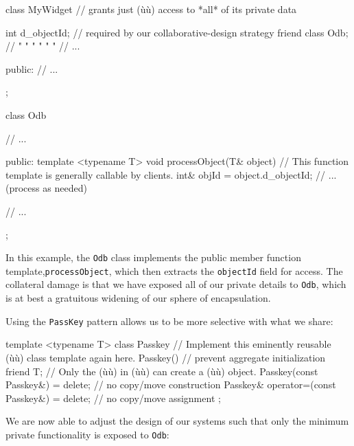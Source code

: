 \begin{emcppslisting}
class MyWidget  // grants just (ù{}ù) access to *all* of its private data
{
    int d_objectId;    // required by our collaborative-design strategy
    friend class Odb;  //    "     "   "        "        "       "
    // ...

public:
    // ...
};

class Odb
{
    // ...

public:
    template <typename T>
    void processObject(T& object)
        // This function template is generally callable by clients.
    {
        int& objId = object.d_objectId;
        // ... (process as needed)
    }

    // ...
};
\end{emcppslisting}
    
\noindent In this example, the \lstinline!Odb! class implements the public member
function template,\linebreak[4] \lstinline!processObject!, which then extracts the
\lstinline!objectId! field for access. The collateral damage is that we
have exposed all of our private details to \lstinline!Odb!, which is at
best a gratuitous widening of our sphere of encapsulation.

Using the \lstinline!PassKey! pattern allows us to be more selective with
what we share:

\begin{emcppslisting}[emcppsbatch=e3]
template <typename T>
class Passkey
    // Implement this eminently reusable (ù{}ù) class template again here.
{
    Passkey() { }  // prevent aggregate initialization
    friend T;      // Only the (ù{}ù) in (ù{}ù) can create a (ù{}ù) object.
    Passkey(const Passkey&) = delete;             // no copy/move construction
    Passkey& operator=(const Passkey&) = delete;  // no copy/move assignment
};
\end{emcppslisting}
    
\noindent We are now able to adjust the design of our systems such that only the
minimum private functionality is exposed to \lstinline!Odb!:

